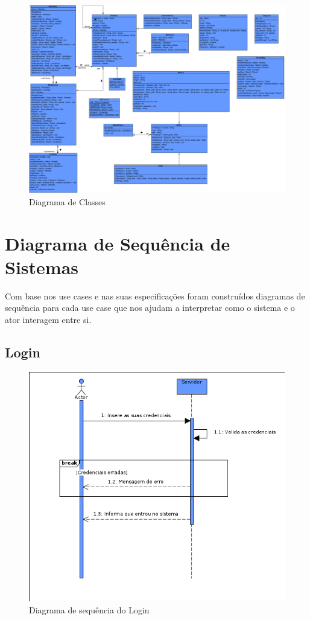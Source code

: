 \documentclass[a4paper]{report}
\begin{document}
\begin{figure}[H]
	\centering 
    \includegraphics[width=\textwidth]{images/classdiagram.png}  
    \caption{Diagrama de Classes}
\end{figure}

\chapter{Diagrama de Sequência de Sistemas}
Com base nos use cases e nas suas especificações foram construídos diagramas de sequência
para cada use case que nos ajudam a interpretar como o sistema e o ator interagem entre
si.

\section{Login}
\begin{figure}[H]
	\centering 
    \includegraphics[width=\textwidth]{images/loginSeq.png}  
    \caption{Diagrama de sequência do Login}
\end{figure}
\end{document}
